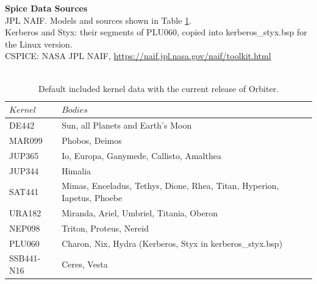 \documentclass[Orbiter User Manual.tex]{subfiles}
\begin{document}
\textbf{Spice Data Sources}\\
JPL NAIF. Models and sources shown in Table \ref{tab:spicedata}.\\
Kerberos and Styx: their segments of PLU060\cite{PLU060}, copied into kerberos\_styx.bsp for the Linux version.\\
CSPICE: NASA JPL NAIF, \url{https://naif.jpl.nasa.gov/naif/toolkit.html}\\
\\
\begin{table}[]
\begin{tabular}{|l|l|}
\hline
$Kernel$             & $Bodies$                                                                \\ \hline
DE442\cite{DE440}\cite{DE442}     & Sun, all Planets and Earth's Moon                          \\ \hline
MAR099\cite{MAR099}  & Phobos, Deimos                                                          \\ \hline
JUP365\cite{JUP365}  & Io, Europa, Ganymede, Callisto, Amalthea                                \\ \hline
JUP344\cite{JUP344}  & Himalia                                                                 \\ \hline
SAT441\cite{SAT441}  & Mimas, Enceladus, Tethys, Dione, Rhea, Titan, Hyperion, Iapetus, Phoebe \\ \hline
URA182\cite{URA182}  & Miranda, Ariel, Umbriel, Titania, Oberon                                \\ \hline
NEP098\cite{NEP098}  & Triton, Proteus, Nereid                                                 \\ \hline
PLU060\cite{PLU060}  & Charon, Nix, Hydra (Kerberos, Styx in kerberos\_styx.bsp)              \\ \hline
SSB441-N16\cite{SSB441-N16}    & Ceres, Vesta                                                  \\ \hline
\end{tabular}
\caption{Default included kernel data with the current release of Orbiter.}
\label{tab:spicedata}
\end{table}
\end{document}
